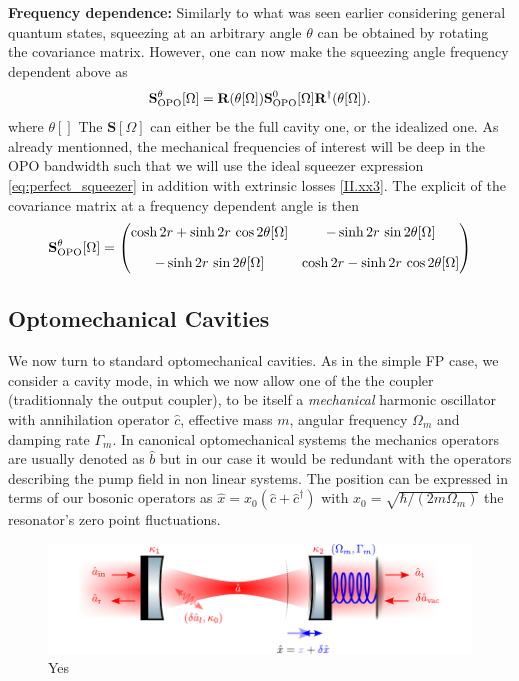 \noindent\textbf{Frequency dependence: } Similarly to what was seen earlier considering general quantum states, squeezing at an arbitrary angle $\theta$ can be obtained by rotating the covariance matrix. However, one can now make the squeezing angle frequency dependent
above as
\begin{equation}
\mathbf{S}^{\theta}_{\rm OPO}[\Omega] = \mathbf R(\theta[\Omega])
\mathbf{S}^0_{\rm OPO}[\Omega] 
\mathbf R^{\dagger}(\theta[\Omega]).
\label{II.xx4}
\end{equation}
where $\theta[]$
The $\mathbf{S}[\Omega]$ can either be the full cavity one, or the idealized one. As already mentionned, the mechanical frequencies of interest will be deep in the OPO bandwidth such that we will use the ideal squeezer expression \eqref{eq:perfect_squeezer} in addition with extrinsic losses \eqref{II.xx3}. The explicit of the covariance matrix at a frequency dependent angle is then
\begin{equation}
      \mathbf{S}^{\theta}_{\rm OPO}[\Omega] =\begin{pmatrix}
         \cosh 2r  + \sinh 2r \, \cos 2\theta[\Omega]  & -\sinh 2r \, \sin 2\theta[\Omega]  \\[10pt]
        -\sinh 2r \, \sin 2\theta[\Omega]  & \cosh 2r  - \sinh 2r \, \cos 2\theta[\Omega] 
      \end{pmatrix}
\end{equation}


\subsection{Optomechanical Cavities}
We now turn to standard optomechanical cavities. As in the simple FP case, we consider a cavity mode, in which we now allow one of the the coupler (traditionnaly the output coupler), to be itself a \textit{mechanical} harmonic oscillator with annihilation operator $\hat{c}$, effective mass $m$, angular frequency $\Omega_m$ and damping rate $\Gamma_m$. In canonical optomechanical systems the mechanics operators are usually denoted as $\hat b$ but in our case it would be redundant with the operators describing the pump field in non linear systems. The position can be expressed in terms of our bosonic operators as  $\hat{x}=x_0(\hat{c}+\hat{c}^{\dagger})$ with $x_0 = \sqrt{\hbar/(2m\Omega_m)}$ the resonator's zero point fluctuations. 

\begin{figure}[h!]
\centering
\includegraphics[width=\textwidth]{./chap2/fig/CavityOM.pdf}
\caption{Yes} 
\label{fig:cavity_types}
\end{figure}

